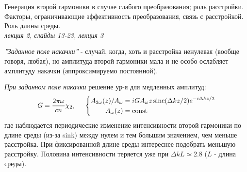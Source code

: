 
\begin{leftrules}
Генерация второй гармоники в случае слабого преобразования; роль расстройки. Факторы, ограничивающие эффективность преобразования, связь с расстройкой. Роль длины среды. 
\\ \phantom{42} \hfill \textit{лекция 2, слайды 13-23, лекция 3}
\end{leftrules}


\begin{to_def}
    \textit{''Заданное поле накачки''} - случай, когда, хоть и расстройка ненулевая (вообще говоря, любая), но амплитуда второй гармоники мала и не особо ослабляет амплитуду накачки (аппроксимируемо постоянной).
\end{to_def}

\textit{При заданном поле накачки} решение ур-я для медленных амплитуд:
\begin{equation*}
    G=\frac{2\pi \omega}{cn}\chi_{2}, \hspace{5 mm} \left\{\begin{aligned}
        A_{2\omega}(z)/A_{\omega}&=iGA_{\omega}z \mathop{\mathrm{sinc}}\nolimits(\Delta k z/2) e^{-i\Delta k z/2} \\
        A_{\omega}(z)&=\textnormal{const}
    \end{aligned}\right.
\end{equation*}
где наблюдается периодические изменение интенсивности второй гармоники по длине среды (из-за sink) между нулем и тем большим значением, чем меньше расстройка. При фиксированной длине среды интереснее подобрать меньшую расстройку. Половина интенсивности теряется уже при $\Delta k L \simeq 2.8$ ($L$ - длина среды).


